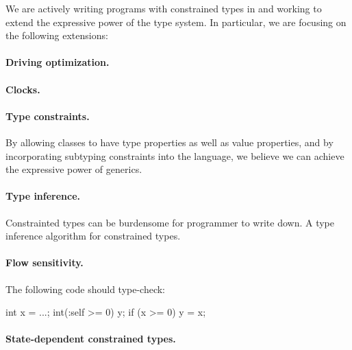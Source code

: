 %
%
%
%

We are actively writing programs with constrained types in
\Xten{} and 
working to extend the expressive power of the type system.
In particular, we are focusing on the following extensions:

\paragraph{Driving optimization.}
\paragraph{Clocks.}
\paragraph{Type constraints.}
By allowing classes to have type properties as well as value properties,
and by incorporating subtyping constraints into the language, we believe we can achieve the expressive power of generics.

\paragraph{Type inference.}  Constrainted types can be burdensome for
programmer to write down.  A type inference algorithm for constrained types.

\paragraph{Flow sensitivity.}  The following code should type-check:
\begin{xten}
int x = ...;
int(:self >= 0) y;
if (x >= 0) {
    y = x;
}
\end{xten}

\paragraph{State-dependent constrained types.}

